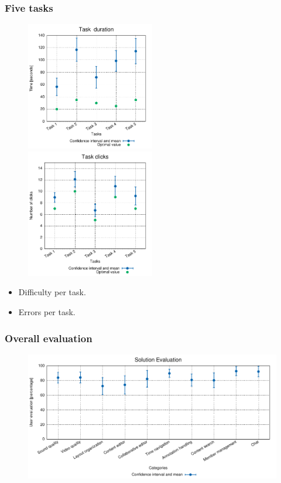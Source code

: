 \documentclass[compress]{beamer}
\begin{document}
	\begin{frame}[c]
		\frametitle{Five tasks}
		\begin{figure}[H]
			\includegraphics[width=0.5\textwidth]{figures/user_times.pdf}
			\includegraphics[width=0.5\textwidth]{figures/user_clicks.pdf}
		\end{figure}
		\begin{itemize}
			\item Difficulty per task.
			\item Errors per task.
		\end{itemize}
	\end{frame}
	\begin{frame}[c]
		\frametitle{Overall evaluation}
		\begin{figure}[H]
			\includegraphics[width=\textwidth]{figures/user_evals.pdf}
		\end{figure}
	\end{frame}
\end{document}
